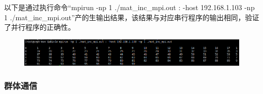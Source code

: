 \documentclass{article}
\begin{document}
					以下是通过执行命令``mpirun -np 1 ./mat\_inc\_mpi.out : -host 192.168.1.103 -np 1 ./mat\_inc\_mpi.out''产的生输出结果，该结果与对应串行程序的输出相同，验证了并行程序的正确性。
					\begin{figure}[H]
						\centering
						\includegraphics[width=1\linewidth]{image/mat_inc_mpi.png}
					\end{figure}
				\subsubsection{群体通信}
				
\end{document}
